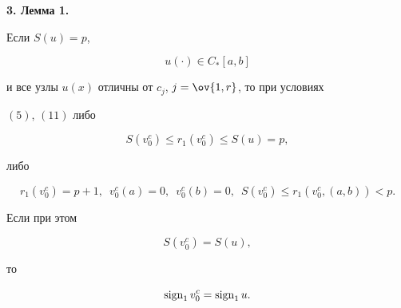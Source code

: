 {\bf 3. Лемма 1.}{\it  


Если $S(u)=p$, 


\begin{equation} 


u(\cdot)\in C_*[a,b] 


\end{equation} 


и все узлы $u(x)$ отличны от $c_j$, $j=\ov{1,r}$, то при условиях 


$(5)$, $(11)$ либо 


\begin{equation} 


S(v^c_0)\le r_1(v^c_0)\le S(u)=p, 


\end{equation} 


либо 


\begin{equation} 


r_1(v^c_0)=p+1,\ \; v^c_0(a)=0,\ \; v^c_0(b)=0, 


\ \; S(v^c_0)\le r_1(v^c_0,(a,b))<p. 


\end{equation} 


Если при этом 


\begin{equation} 


S(v^c_0)=S(u), 


\end{equation} 


то 


\begin{equation} 


\sign_1v^c_0=\sign_1u. 


\end{equation} 


} 


 


